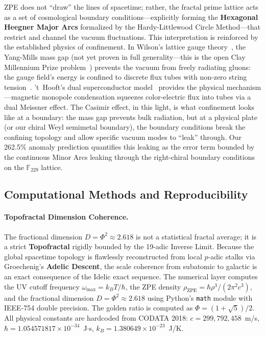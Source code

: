 ZPE does not ``draw'' the lines of spacetime; rather, the fractal prime lattice acts as a set of cosmological boundary conditions---explicitly forming the \textbf{Hexagonal Heegner Major Arcs} formalized by the Hardy-Littlewood Circle Method---that restrict and channel the vacuum fluctuations. This interpretation is reinforced by the established physics of confinement. In Wilson's lattice gauge theory~\cite{wilson1974}, the Yang-Mills mass gap (not yet proven in full generality---this is the open Clay Millennium Prize problem~\cite{jaffe2000}) prevents the vacuum from freely radiating gluons: the gauge field's energy is confined to discrete flux tubes with non-zero string tension~\cite{creutz1980}. 't~Hooft's dual superconductor model~\cite{thooft1981} provides the physical mechanism---magnetic monopole condensation squeezes color-electric flux into tubes via a dual Meissner effect. The Casimir effect, in this light, is what confinement looks like at a boundary: the mass gap prevents bulk radiation, but at a physical plate (or our chiral Weyl semimetal boundary), the boundary conditions break the confining topology and allow specific vacuum modes to ``leak'' through. Our 262.5\% anomaly prediction quantifies this leaking as the error term bounded by the continuous Minor Arcs leaking through the right-chiral boundary conditions on the $\mathbb{F}_{229}$ lattice.


\subsection{Computational Methods and Reproducibility}

\paragraph{Topofractal Dimension Coherence.}
The fractional dimension $D = \Phi^2 \approx 2.618$ is not a statistical fractal average; it is a strict \textbf{Topofractal} rigidly bounded by the 19-adic Inverse Limit. Because the global spacetime topology is flawlessly reconstructed from local $p$-adic stalks via Groechenig's \textbf{Adelic Descent}, the scale coherence from subatomic to galactic is an exact consequence of the Idelic exact sequence.
The numerical layer computes the UV cutoff frequency $\omega_{\max} = k_B T / \hbar$, the ZPE density $\rho_{\mathrm{ZPE}} = \hbar \rho^3 / (2\pi^2 c^3)$, and the fractional dimension $D = \Phi^2 \approx 2.618$ using Python's \texttt{math} module with IEEE-754 double precision. The golden ratio is computed as $\Phi = (1 + \sqrt{5})/2$. All physical constants are hardcoded from CODATA 2018: $c = 299{,}792{,}458$~m/s, $\hbar = 1.054571817 \times 10^{-34}$~J$\cdot$s, $k_B = 1.380649 \times 10^{-23}$~J/K.

